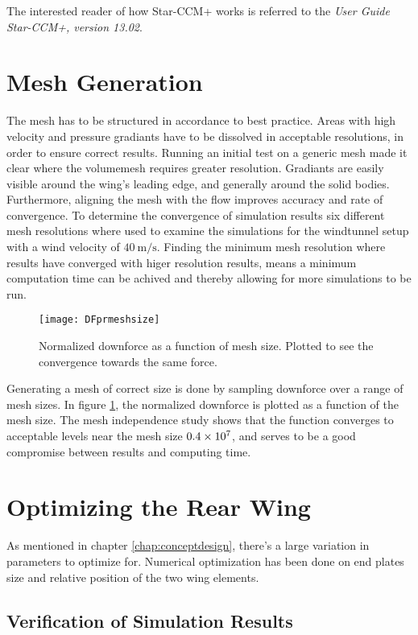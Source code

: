   The interested reader of how Star-CCM+ works is referred to the \emph{User Guide Star-CCM+, version 13.02}.

\section{Mesh Generation}
\label{sec:mesh}
  The mesh has to be structured in accordance to best practice. Areas with high velocity and pressure gradiants have to be dissolved in acceptable resolutions, in order to ensure correct results. Running an initial test on a generic mesh made it clear where the volumemesh requires greater resolution. Gradiants are easily visible around the wing's leading edge, and generally around the solid bodies. Furthermore, aligning the mesh with the flow improves accuracy and rate of convergence. To determine the convergence of simulation results six different mesh resolutions where used to examine the simulations for the windtunnel setup with a wind velocity of $\SI{40}{\metre\per\second}$. Finding the minimum mesh resolution where results have converged with higer resolution results, means a minimum computation time can be achived and thereby allowing for more simulations to be run.

  \begin{figure}
    \texttt{[image: DFprmeshsize]}
    \caption{Normalized downforce as a function of mesh size. Plotted to see the convergence towards the same force.}
    \label{fig:DFprmeshsize}
  \end{figure}

  Generating a mesh of correct size is done by sampling downforce over a range of mesh sizes. In figure \ref{fig:DFprmeshsize}, the normalized downforce is plotted as a function of the mesh size. The mesh independence study shows that the function converges to acceptable levels near the mesh size $\SI{.4E7}{}$, and serves to be a good compromise between results and computing time.

\section{Optimizing the Rear Wing}

  As mentioned in chapter \ref{chap:conceptdesign}, there's a large variation in parameters to optimize for. Numerical optimization has been done on end plates size and relative position of the two wing elements.


  \subsection{Verification of Simulation Results}
  \label{sec:simulationcomparison}

